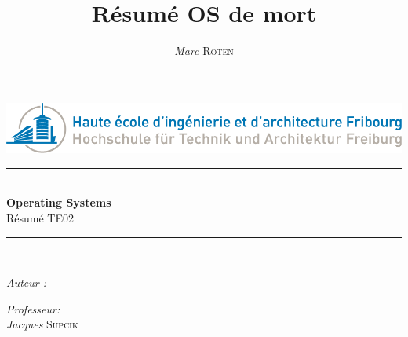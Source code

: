 
 
\title{Résumé OS de mort} 
\author{\textsl{Marc} \textsc{Roten}}
\date{}




    \begin{titlepage}
        \begin{center}
            \includegraphics[scale=.4]{Img/heia-fr-logo.png}\\[1.3cm]
            
            \rule{\linewidth}{0.3mm} \\[0.3cm]
            {\huge \bfseries Operating Systems\\[0.5cm]} 
            {\Large  Résumé TE02 }
            \rule{\linewidth}{0.3mm} \\[0.8cm]
            \noindent{}
            \begin{minipage}[t]{0.4\textwidth}
                \begin{flushleft} \large
                    \emph{Auteur :}\\
                    \theauthor
                \end{flushleft}
            \end{minipage}
            \begin{minipage}[t]{0.4\textwidth} 
                \begin{flushright} \large
                    \emph{Professeur:}\\
                    \textsl{Jacques} \textsc{ Supcik}\\ 
                \end{flushright} 
                \vfill
            \end{minipage}\\[1.3cm]

\end{center}
\end{titlepage}
